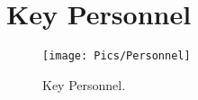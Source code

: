 \section{Key Personnel}
\samepage
\begin{figure}[H]
    \centering
    \texttt{[image: Pics/Personnel]}
    \caption{Key Personnel.}
\end{figure}